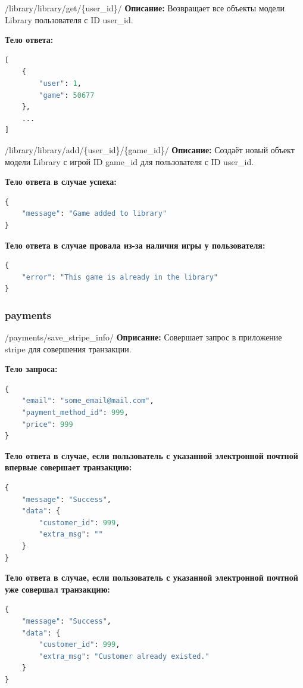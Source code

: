 \documentclass[a4paper,14pt]{extarticle}
\begin{document}
	\begin{getapi}{/library/library/get/\{user\_id\}/}
		\textbf{Описание:} Возвращает все объекты модели Library пользователя с ID user\_id.\medskip
		
		\textbf{Тело ответа:}
		\begin{lstlisting}[language=Python]
[
    {
        "user": 1,
        "game": 50677
    },
    ...
]
		\end{lstlisting}
	\end{getapi}
	
	\begin{postapi}{/library/library/add/\{user\_id\}/\{game\_id\}/}
		\textbf{Описание:} Создаёт новый объект модели Library с игрой ID game\_id для пользователя с ID user\_id.\medskip
		
		\textbf{Тело ответа в случае успеха:}
		\begin{lstlisting}[language=Python]
{
    "message": "Game added to library"
}
\end{lstlisting}
		
		\textbf{Тело ответа в случае провала из-за наличия игры у пользователя:}
		\begin{lstlisting}[language=Python]
{
    "error": "This game is already in the library"
}
		\end{lstlisting}
	\end{postapi}
	
	\subsubsection{payments}
	\begin{postapi}{/payments/save\_stripe\_info/}
		\textbf{Оприсание:} Совершает запрос в приложение stripe для совершения транзакции.\medskip
		
		\textbf{Тело запроса:}
		\begin{lstlisting}[language=Python]
{
    "email": "some_email@mail.com",
    "payment_method_id": 999,
    "price": 999
}
		\end{lstlisting}
		
		\textbf{Тело ответа в случае, если пользователь с указанной электронной почтной впервые совершает транзакцию:}
		\begin{lstlisting}[language=Python]
{
    "message": "Success", 
    "data": {
        "customer_id": 999, 
        "extra_msg": ""
    }
}
		\end{lstlisting}
		
		\textbf{Тело ответа в случае, если пользователь с указанной электронной почтной уже совершал транзакцию:}
		\begin{lstlisting}[language=Python]
{
    "message": "Success", 
    "data": {
        "customer_id": 999, 
        "extra_msg": "Customer already existed."
    }
}
		\end{lstlisting}
	\end{postapi}
	
\end{document}
